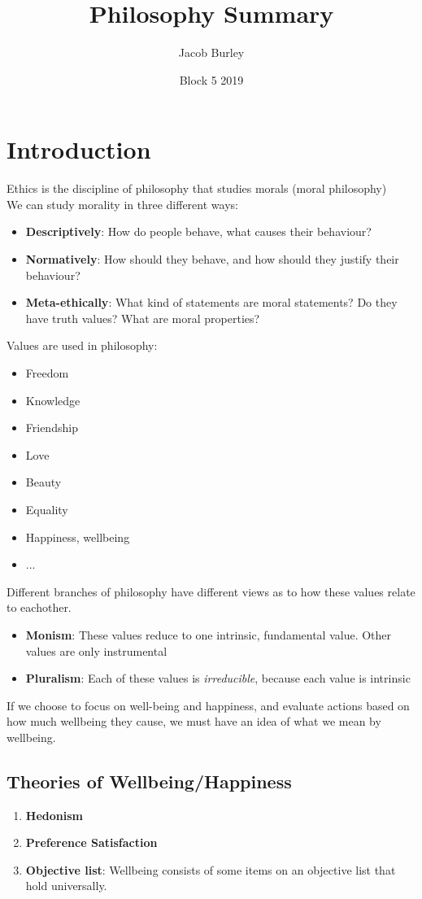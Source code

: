 \documentclass{article}
\title{Philosophy Summary}
\author{Jacob Burley}
\date{Block 5 2019}
\begin{document}
\maketitle

\tableofcontents
\newpage
\section{Introduction}
Ethics is the discipline of philosophy that studies morals (moral philosophy)
\\We can study morality in three different ways:
\begin{itemize}
    \item \textbf{Descriptively}: How do people behave, what causes their behaviour?
    \item \textbf{Normatively}: How should they behave, and how should they justify their behaviour?
    \item \textbf{Meta-ethically}: What kind of statements are moral statements? Do they have truth values? What are moral properties?
\end{itemize}{}
Values are used in philosophy:
\begin{itemize}
    \item Freedom
    \item Knowledge
    \item Friendship
    \item Love
    \item Beauty
    \item Equality
    \item Happiness, wellbeing
    \item ...
\end{itemize}{}
Different branches of philosophy have different views as to how these values relate to eachother.
\begin{itemize}
    \item \textbf{Monism}: These values reduce to one intrinsic, fundamental value. Other values are only instrumental
    \item \textbf{Pluralism}: Each of these values is \textit{irreducible}, because each value is intrinsic
\end{itemize}
If we choose to focus on well-being and happiness, and evaluate actions based on how much wellbeing they cause, we must have an idea of what we mean by wellbeing.

    \subsection{Theories of Wellbeing/Happiness}
    \begin{enumerate}
        \item \textbf{Hedonism}
        \item \textbf{Preference Satisfaction}
        \item \textbf{Objective list}: Wellbeing consists of some items on an objective list that hold universally.
    \end{enumerate}{}
\end{document}
